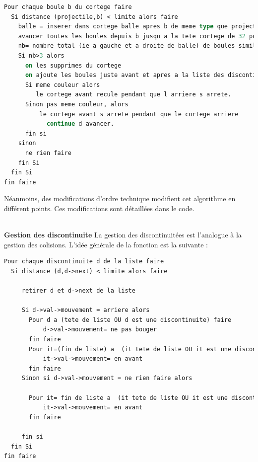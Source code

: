 \begin{lstlisting}[language=Pascal]
Pour chaque boule b du cortege faire
  Si distance (projectile,b) < limite alors faire
    balle = inserer dans cortege balle apres b de meme type que projectile
    avancer toutes les boules depuis b jusqu a la tete cortege de 32 points
    nb= nombre total (ie a gauche et a droite de balle) de boules similaires
    Si nb>3 alors  
      on les supprimes du cortege
      on ajoute les boules juste avant et apres a la liste des discontinuite
      Si meme couleur alors
         le cortege avant recule pendant que l arriere s arrete.
      Sinon pas meme couleur, alors
          le cortege avant s arrete pendant que le cortege arriere
            continue d avancer.
      fin si
    sinon 
      ne rien faire
    fin Si
  fin Si
fin faire
\end{lstlisting}

Néanmoins, des modifications d'ordre technique modifient cet
algorithme en différent points. Ces modifications sont détaillées dans
le code.


~\\
\textbf{Gestion des discontinuite}
La gestion des discontinuitées est l'analogue à la gestion des
colisions.
L'idée générale de la fonction est la suivante :
\begin{lstlisting}[language=Pascal]
Pour chaque discontinuite d de la liste faire
  Si distance (d,d->next) < limite alors faire

     retirer d et d->next de la liste

     Si d->val->mouvement = arriere alors
       Pour d a (tete de liste OU d est une discontinuite) faire
           d->val->mouvement= ne pas bouger
       fin faire 
       Pour it=(fin de liste) a  (it tete de liste OU it est une discontinuite) faire
           it->val->mouvement= en avant
       fin faire    
     Sinon si d->val->mouvement = ne rien faire alors

       Pour it= fin de liste a  (it tete de liste OU it est une discontinuite) faire
           it->val->mouvement= en avant
       fin faire         
       
     fin si
  fin Si
fin faire
\end{lstlisting}

